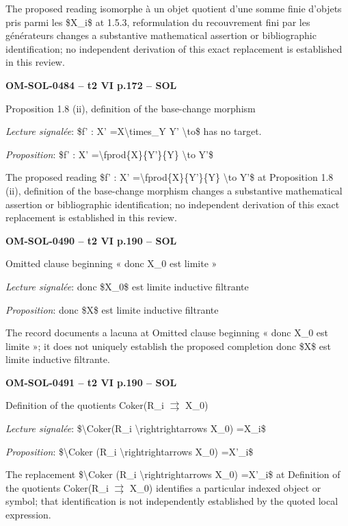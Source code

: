The proposed reading isomorphe à un objet quotient d'une somme finie d'objets pris parmi les \$X\_i\$ at 1.5.3, reformulation du recouvrement fini par les générateurs changes a substantive mathematical assertion or bibliographic identification; no independent derivation of this exact replacement is established in this review.\par
\par\noindent\textbf{OM-SOL-0484 -- t2 VI p.172 -- SOL}\par
Proposition 1.8 (ii), definition of the base-change morphism\par
\emph{Lecture signalée}: \$f' : X' =\allowbreak  X\textbackslash{}times\_Y Y' \textbackslash{}to\$ has no target.\par
\emph{Proposition}: \$f' : X' =\allowbreak  \textbackslash{}fprod\{X\}\{Y'\}\{Y\} \textbackslash{}to Y'\$\par
The proposed reading \$f' : X' =\allowbreak  \textbackslash{}fprod\{X\}\{Y'\}\{Y\} \textbackslash{}to Y'\$ at Proposition 1.8 (ii), definition of the base-change morphism changes a substantive mathematical assertion or bibliographic identification; no independent derivation of this exact replacement is established in this review.\par
\par\noindent\textbf{OM-SOL-0490 -- t2 VI p.190 -- SOL}\par
Omitted clause beginning « donc X\_0 est limite »\par
\emph{Lecture signalée}: donc \$X\_0\$ est limite inductive filtrante\par
\emph{Proposition}: donc \$X\$ est limite inductive filtrante\par
The record documents a lacuna at Omitted clause beginning « donc X\_0 est limite »; it does not uniquely establish the proposed completion donc \$X\$ est limite inductive filtrante.\par
\par\noindent\textbf{OM-SOL-0491 -- t2 VI p.190 -- SOL}\par
Definition of the quotients Coker(R\_i \ensuremath{\rightrightarrows} X\_0)\par
\emph{Lecture signalée}: \$\textbackslash{}Coker(R\_i \textbackslash{}rightrightarrows X\_0) =\allowbreak  X\_i\$\par
\emph{Proposition}: \$\textbackslash{}Coker (R\_i \textbackslash{}rightrightarrows X\_0) =\allowbreak  X'\_i\$\par
The replacement \$\textbackslash{}Coker (R\_i \textbackslash{}rightrightarrows X\_0) =\allowbreak  X'\_i\$ at Definition of the quotients Coker(R\_i \ensuremath{\rightrightarrows} X\_0) identifies a particular indexed object or symbol; that identification is not independently established by the quoted local expression.\par
